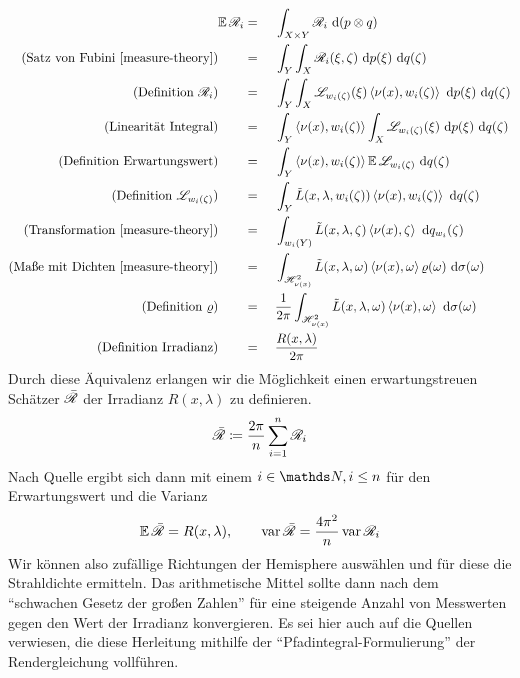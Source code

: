 		\begin{alignat*}{3}
			\expect \e{R}_i &=&&\ \integral{X\times Y}{}{\e{R}_i}{(p\otimes q)} \\
			\text{(Satz von Fubini \cite[S.~175~f]{measure-theory})}\qquad &=&&\ \integral{Y}{}{ \integral{X}{}{ \e{R}_i(\xi,\zeta) }{p(\xi)} }{q(\zeta)} \\
			\text{(Definition $\e{R}_i$)}\qquad &=&&\ \integral{Y}{}{ \integral{X}{}{ \e{L}_{w_i(\zeta)}(\xi) \dotp{\nu(x)}{w_i(\zeta)} }{p(\xi)} }{q(\zeta)} \\
			\text{(Linearität Integral)}\qquad &=&&\ \integral{Y}{}{ \dotp{\nu(x)}{w_i(\zeta)} \integral{X}{}{ \e{L}_{w_i(\zeta)}(\xi)  }{p(\xi)} }{q(\zeta)} \\
			\text{(Definition Erwartungswert)}\qquad&=&&\ \integral{Y}{}{ \dotp{\nu(x)}{w_i(\zeta)}\expect \e{L}_{w_i(\zeta)} }{q(\zeta)} \\
			\text{(Definition $\e{L}_{w_i(\zeta)}$)}\qquad&=&&\ \integral{Y}{}{ \tilde{L}(x,\lambda,w_i(\zeta)) \dotp{\nu(x)}{w_i(\zeta)}}{q(\zeta)} \\
			\text{(Transformation \cite[S.~191~f]{measure-theory})}\qquad &=&&\ \integral{w_i(Y)}{}{ \tilde{L}(x,\lambda,\zeta) \dotp{\nu(x)}{\zeta}}{q_{w_i}(\zeta)} \\
			\text{(Maße mit Dichten \cite[S.~127~f]{measure-theory})}\qquad &=&&\ \integral{\shs{\nu(x)}}{}{\tilde{L}(x,\lambda,\omega)\dotp{\nu(x)}{\omega}\varrho(\omega)}{\sigma(\omega)} \\
			\text{(Definition $\varrho$)}\qquad&=&&\ \frac{1}{2\pi} \integral{\shs{\nu(x)}}{}{\tilde{L}(x,\lambda,\omega)\dotp{\nu(x)}{\omega}}{\sigma(\omega)} \\
			\text{(Definition Irradianz)}\qquad&=&&\ \frac{R(x,\lambda)}{2\pi}
		\end{alignat*}
		Durch diese Äquivalenz erlangen wir die Möglichkeit einen erwartungstreuen Schätzer $\bar{\mathscr{R}}$ der Irradianz $R(x,\lambda)$ zu definieren.
		\[
			\bar{\mathscr{R}} \coloneqq \frac{2\pi}{n}\sum_{i=1}^n \mathscr{R}_i
		\]
		Nach Quelle \cite[S.~249~ff]{prob-theory} ergibt sich dann mit einem $i\in\SN,i\leq n$ für den Erwartungswert und die Varianz
		\[
			\operatorname{\mathbb{E}} \bar{\mathscr{R}} = R(x,\lambda),\qquad \operatorname{var} \bar{\mathscr{R}} = \frac{4\pi^2}{n}\operatorname{var} \mathscr{R}_i
		\]
		Wir können also zufällige Richtungen der Hemisphere auswählen und für diese die Strahldichte ermitteln.
		Das arithmetische Mittel sollte dann nach dem \enquote{schwachen Gesetz der großen Zahlen} \cite[S.~254]{prob-theory} für eine steigende Anzahl von Messwerten gegen den Wert der Irradianz konvergieren.
		Es sei hier auch auf die Quellen \cite{kajiya-lte,pbrt3,veach-thesis} verwiesen, die diese Herleitung mithilfe der \enquote{Pfadintegral-Formulierung} der Rendergleichung vollführen.

